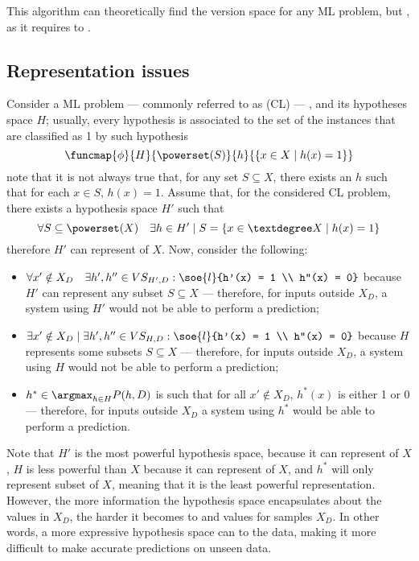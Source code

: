 \documentclass[a4paper, 12pt]{report}
\begin{document}
    This algorithm can theoretically find the version space for any ML problem, but , as it requires to .

    \subsection{Representation issues}

    Consider a  ML problem --- commonly referred to as  (CL) --- , and its hypotheses space $H$; usually, every hypothesis is associated to the set of the instances that are classified as 1 by such hypothesis $$\funcmap{\phi}{H}{\powerset(S)}{h}{\{x \in X \mid h(x) = 1\}}$$ note that it is not always true that, for any set $S \subseteq X$, there exists an $h$ such that for each $x \in S$, $h(x) = 1$. Assume that, for the considered CL problem, there exists a hypothesis space $H'$ such that $$\forall S \subseteq \powerset(X) \quad \exists h \in H' \mid S = \{x \in °X \mid h(x)  = 1\}$$ therefore $H'$ can represent  of $X$. Now, consider the following:

    \begin{itemize}
        \item $\forall x' \notin X_D \quad \exists h', h'' \in VS_{H', D} : \soe{l}{h'(x) = 1 \\ h''(x) = 0}$ because $H'$ can represent any subset $S \subseteq X$ --- therefore, for  inputs outside $X_D$, a system using $H'$ would not be able to perform a prediction;
        \item $\exists x' \notin X_D \mid \exists h', h'' \in VS_{H, D} : \soe{l}{h'(x) = 1 \\ h''(x) = 0}$ because $H$ represents some subsets $S \subseteq X$ ---  therefore, for  inputs outside $X_D$, a system using $H$ would not be able to perform a prediction;
        \item $h^* \in \argmax_{h \in H}{P(h, D)}$ is such that for all $x' \notin X_D$, $h^*(x)$ is either 1 or 0 --- therefore, for  inputs outside $X_D$ a system using $h^*$ would be able to perform a prediction.
    \end{itemize}

    Note that $H'$ is the most powerful hypothesis space, because it can represent  of $X$, $H$ is less powerful than $X$ because it can represent  of $X$, and $h^*$ will only represent  subset of $X$, meaning that it is the least powerful representation. However, the more information the hypothesis space encapsulates about the values in $X_D$, the harder it becomes to  and  values for samples  $X_D$. In other words, a more expressive hypothesis space can  to the data, making it more difficult to make accurate predictions on unseen data.
    
\end{document}

